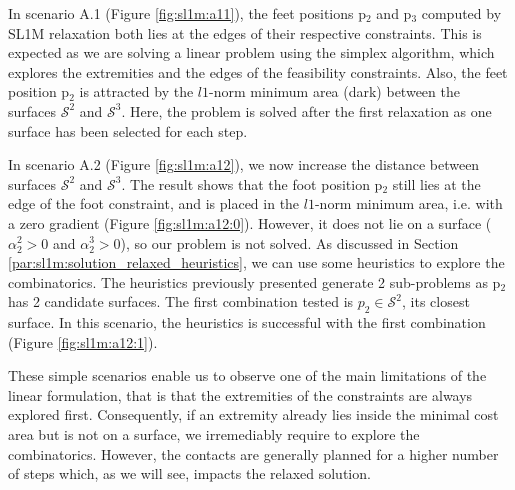 In scenario A.1 (Figure \ref{fig:sl1m:a11}), the feet positions p$_2$ and p$_3$ computed by SL1M relaxation both lies at the edges of their respective constraints. 
This is expected as we are solving a linear problem using the simplex algorithm, which explores the extremities and the edges of the feasibility constraints.
Also, the feet position p$_2$ is attracted by the $l1$-norm minimum area (dark) between the surfaces $\mathcal{S}^2$ and $\mathcal{S}^3$. 
Here, the problem is solved after the first relaxation as one surface has been selected for each step.

In scenario A.2 (Figure \ref{fig:sl1m:a12}), we now increase the distance between surfaces $\mathcal{S}^2$ and $\mathcal{S}^3$.
The result shows that the foot position p$_2$ still lies at the edge of the foot constraint, and is placed in the $l1$-norm minimum area, i.e. with a zero gradient (Figure \ref{fig:sl1m:a12:0}).
However, it does not lie on a surface ($\alpha_2^2 > 0$ and $\alpha_2^3 > 0$), so our problem is not solved.
As discussed in Section \ref{par:sl1m:solution_relaxed_heuristics}, we can use some heuristics to explore the combinatorics. 
The heuristics previously presented generate 2 sub-problems as p$_2$ has 2 candidate surfaces.
The first combination tested is $p_2 \in \mathcal{S}^2$, its closest surface.
In this scenario, the heuristics is successful with the first combination (Figure \ref{fig:sl1m:a12:1}).

These simple scenarios enable us to observe one of the main limitations of the linear formulation, that is that the extremities of the constraints are always explored first. Consequently, if an extremity already lies inside the minimal cost area but is not on a surface, we irremediably require to explore the combinatorics. However, the contacts are generally planned for a higher number of steps which, as we will see, impacts the relaxed solution.

